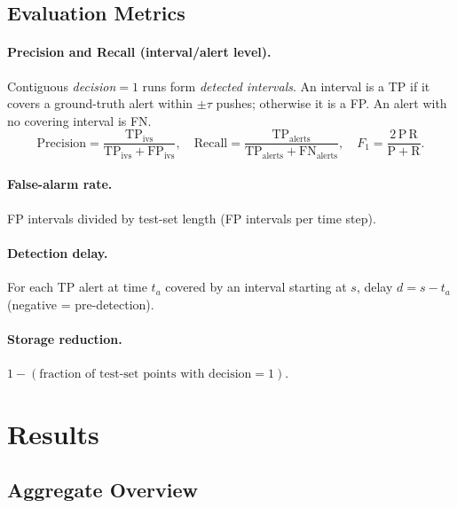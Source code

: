\documentclass[11pt,a4paper]{article}
\begin{document}
\subsection{Evaluation Metrics}

\paragraph{Precision and Recall (interval/alert level).}
Contiguous \emph{decision}$=1$ runs form \emph{detected intervals}.
An interval is a TP if it covers a ground-truth alert within $\pm\tau$
pushes; otherwise it is a FP.  An alert with no covering interval is FN.
\[
  \mathrm{Precision} = \frac{\mathrm{TP}_{\mathrm{ivs}}}
                            {\mathrm{TP}_{\mathrm{ivs}}+\mathrm{FP}_{\mathrm{ivs}}},
  \quad
  \mathrm{Recall}    = \frac{\mathrm{TP}_{\mathrm{alerts}}}
                            {\mathrm{TP}_{\mathrm{alerts}}+\mathrm{FN}_{\mathrm{alerts}}},
  \quad
  F_1               = \frac{2\,\mathrm{P}\,\mathrm{R}}{\mathrm{P}+\mathrm{R}}.
\]

\paragraph{False-alarm rate.}
FP intervals divided by test-set length (FP intervals per time step).

\paragraph{Detection delay.}
For each TP alert at time $t_a$ covered by an interval starting at $s$,
delay $d = s - t_a$ (negative = pre-detection).

\paragraph{Storage reduction.}
$1 - (\text{fraction of test-set points with decision}=1)$.


\section{Results}

\subsection{Aggregate Overview}
\end{document}
